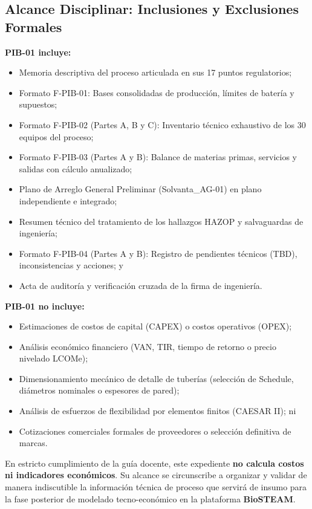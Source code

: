 \documentclass[10pt,letterpaper]{article}
\begin{document}
\subsection{Alcance Disciplinar: Inclusiones y Exclusiones Formales}
\textbf{PIB-01 incluye:}
\begin{itemize}
    \item Memoria descriptiva del proceso articulada en sus 17 puntos regulatorios;
    \item Formato F-PIB-01: Bases consolidadas de producción, límites de batería y supuestos;
    \item Formato F-PIB-02 (Partes A, B y C): Inventario técnico exhaustivo de los 30 equipos del proceso;
    \item Formato F-PIB-03 (Partes A y B): Balance de materias primas, servicios y salidas con cálculo anualizado;
    \item Plano de Arreglo General Preliminar (Solvanta\_AG-01) en plano independiente e integrado;
    \item Resumen técnico del tratamiento de los hallazgos HAZOP y salvaguardas de ingeniería;
    \item Formato F-PIB-04 (Partes A y B): Registro de pendientes técnicos (TBD), inconsistencias y acciones; y
    \item Acta de auditoría y verificación cruzada de la firma de ingeniería.
\end{itemize}

\textbf{PIB-01 no incluye:}
\begin{itemize}
    \item Estimaciones de costos de capital (CAPEX) o costos operativos (OPEX);
    \item Análisis económico financiero (VAN, TIR, tiempo de retorno o precio nivelado LCOMe);
    \item Dimensionamiento mecánico de detalle de tuberías (selección de Schedule, diámetros nominales o espesores de pared);
    \item Análisis de esfuerzos de flexibilidad por elementos finitos (CAESAR II); ni
    \item Cotizaciones comerciales formales de proveedores o selección definitiva de marcas.
\end{itemize}

\begin{tcolorbox}[colframe=darkred,colback=boxbg,arc=2mm,boxrule=1pt,title=\textbf{Advertencia Técnica Sobre Evaluación Económica}]
\small
En estricto cumplimiento de la guía docente, este expediente \textbf{no calcula costos ni indicadores económicos}. Su alcance se circunscribe a organizar y validar de manera indiscutible la información técnica de proceso que servirá de insumo para la fase posterior de modelado tecno-económico en la plataforma \textbf{BioSTEAM}.
\end{tcolorbox}
\end{document}
